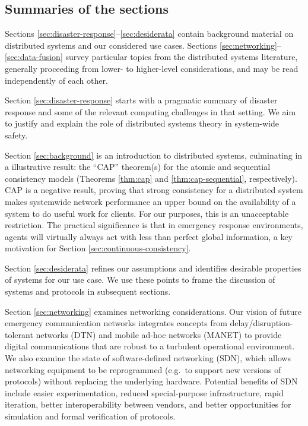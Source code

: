 \documentclass[]             %
{NASA}                       %
\theoremstyle{definition}
\begin{document}
\subsection{Summaries of the sections}\label{summaries-of-the-sections}

Sections \ref{sec:disaster-response}--\ref{sec:desiderata} contain
background material on distributed systems and our considered use cases.
Sections \ref{sec:networking}--\ref{sec:data-fusion} survey particular
topics from the distributed systems literature, generally proceeding
from lower- to higher-level considerations, and may be read
independently of each other.

Section \ref{sec:disaster-response} starts with a pragmatic summary of
disaster response and some of the relevant computing challenges in that
setting. We aim to justify and explain the role of distributed systems
theory in system-wide safety.

Section \ref{sec:background} is an introduction to distributed systems,
culminating in a illustrative result: the ``CAP'' theorem(s) for the
atomic and sequential consistency models (Theorems \ref{thm:cap} and
\ref{thm:cap-sequential}, respectively). CAP is a negative result,
proving that strong consistency for a distributed system makes
systemwide network performance an upper bound on the availability of a
system to do useful work for clients. For our purposes, this is an
unacceptable restriction. The practical significance is that in
emergency response environments, agents will virtually always act with
less than perfect global information, a key motivation for Section
\ref{sec:continuous-consistency}.

Section \ref{sec:desiderata} refines our assumptions and identifies
desirable properties of systems for our use case. We use these points to
frame the discussion of systems and protocols in subsequent sections.

Section \ref{sec:networking} examines networking considerations. Our
vision of future emergency communication networks integrates concepts
from delay/disruption-tolerant networks (DTN) and mobile ad-hoc networks
(MANET) to provide digital communications that are robust to a turbulent
operational environment. We also examine the state of software-defined
networking (SDN), which allows networking equipment to be reprogrammed
(e.g.~to support new versions of protocols) without replacing the
underlying hardware. Potential benefits of SDN include easier
experimentation, reduced special-purpose infrastructure, rapid
iteration, better interoperability between vendors, and better
opportunities for simulation and formal verification of protocols.
\end{document}
